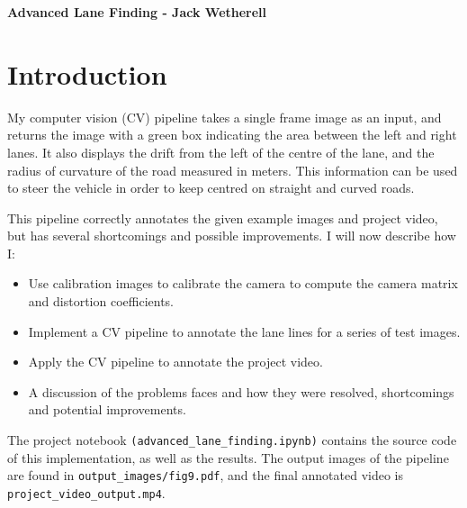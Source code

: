 \documentclass[letterpaper,12pt]{article}
\begin{document}
\title{}
\author{}
\date{}


\begin{center}
\textbf{Advanced Lane Finding - Jack Wetherell} \\
\end{center}


\section{Introduction}
My computer vision (CV) pipeline takes a single frame image as an input, and returns the image with a green box indicating the area between the left and right lanes. It also displays the drift from the left of the centre of the lane, and the radius of curvature of the road measured in meters. This information can be used to steer the vehicle in order to keep centred on straight and curved roads.

This pipeline correctly annotates the given example images and project video, but has several shortcomings and possible improvements. I will now describe how I:
\begin{itemize}
\item Use calibration images to calibrate the camera to compute the camera matrix and distortion coefficients.
\item Implement a CV pipeline to annotate the lane lines for a series of test images.
\item Apply the CV pipeline to annotate the project video.
\item A discussion of the problems faces and how they were resolved, shortcomings and potential improvements. 
\end{itemize}
The project notebook \texttt{(advanced\_lane\_finding.ipynb)} contains the source code of this implementation, as well as the results. The output images of the pipeline are found in \texttt{output\_images/fig9.pdf}, and the final annotated video is \texttt{project\_video\_output.mp4}.
\end{document}
